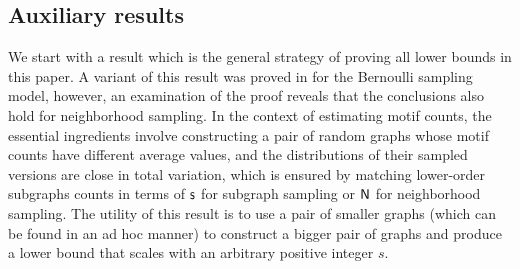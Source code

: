 
\subsection{Auxiliary results}
	\label{app:aux}

We start with a result which is the general strategy of proving all lower bounds in this paper. A variant of this result was proved in \cite{KlusowskiWu2017-cc} for the Bernoulli sampling model, however, an examination of the proof reveals that the conclusions also hold for neighborhood sampling. In the context of estimating motif counts, the essential ingredients involve constructing a pair of random graphs whose motif counts have different average values, and the distributions of their sampled versions are close in total variation, which is ensured by matching lower-order subgraphs counts in terms of $ \mathsf{s} $ for subgraph sampling or $ {\mathsf{N}} $ for neighborhood sampling. The utility of this result is to use a pair of smaller graphs (which can be found in an ad hoc manner) to construct a bigger pair of graphs and produce a lower bound that scales with an arbitrary positive integer $ s $.


